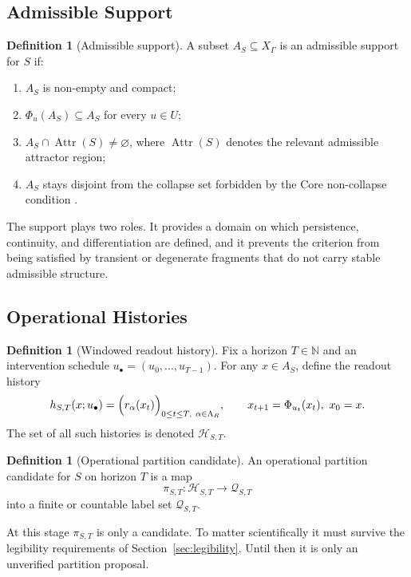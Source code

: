\documentclass[11pt,a4paper]{article}
\theoremstyle{definition}
\newtheorem{definition}[theorem]{Definition}
\newcommand{\Aset}{A_S}
\newcommand{\Attr}{\operatorname{Attr}}
\newcommand{\Hist}{\mathscr{H}}
\newcommand{\Class}{\mathscr{Q}}
\newcommand{\Nset}{\mathbb{N}}
\begin{document}
\subsection{Admissible Support}
\begin{definition}[Admissible support]\label{def:support}
A subset $\Aset \subseteq X_\Gamma$ is an admissible support for $S$ if:
\begin{enumerate}[leftmargin=1.5em]
\item $\Aset$ is non-empty and compact;
\item $\Phi_u(\Aset) \subseteq \Aset$ for every $u \in U$;
\item $\Aset \cap \Attr(S) \neq \varnothing$, where $\Attr(S)$ denotes the relevant admissible attractor region;
\item $\Aset$ stays disjoint from the collapse set forbidden by the Core non-collapse condition \cite{core}.
\end{enumerate}
\end{definition}

The support plays two roles. It provides a domain on which persistence, continuity, and differentiation are defined, and it prevents the criterion from being satisfied by transient or degenerate fragments that do not carry stable admissible structure.

\subsection{Operational Histories}
\begin{definition}[Windowed readout history]\label{def:history}
Fix a horizon $T \in \Nset$ and an intervention schedule $u_\bullet = (u_0,\dots,u_{T-1})$. For any $x \in \Aset$, define the readout history
\[
h_{S,T}(x;u_\bullet)
=
\Bigl(r_\alpha(x_t)\Bigr)_{0 \le t \le T,\ \alpha \in \Lambda_R},
\qquad
x_{t+1} = \Phi_{u_t}(x_t), \ x_0 = x.
\]
The set of all such histories is denoted $\Hist_{S,T}$.
\end{definition}

\begin{definition}[Operational partition candidate]\label{def:partition}
An operational partition candidate for $S$ on horizon $T$ is a map
\[
\pi_{S,T} : \Hist_{S,T} \to \Class_{S,T}
\]
into a finite or countable label set $\Class_{S,T}$.
\end{definition}

At this stage $\pi_{S,T}$ is only a candidate. To matter scientifically it must survive the legibility requirements of Section~\ref{sec:legibility}. Until then it is only an unverified partition proposal.
\end{document}
